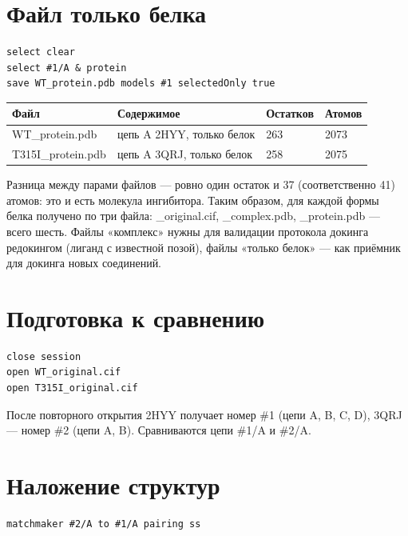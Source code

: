 \documentclass[12pt,a4paper]{article}
\newcommand{\code}[1]{{\ttfamily #1}}
\begin{document}
\section{Файл только белка}

\begin{verbatim}
select clear
select #1/A & protein
save WT_protein.pdb models #1 selectedOnly true
\end{verbatim}

\begin{center}
\begin{tabular}{L{4.6cm}L{4.1cm}L{2.3cm}L{2.3cm}}
\toprule
\textbf{Файл} & \textbf{Содержимое} & \textbf{Остатков} & \textbf{Атомов} \\
\midrule
\code{WT\_protein.pdb} & цепь A 2HYY, только белок & 263 & 2073 \\
\code{T315I\_protein.pdb} & цепь A 3QRJ, только белок & 258 & 2075 \\
\bottomrule
\end{tabular}
\end{center}

\noindent Разница между парами файлов --- ровно один остаток и 37 (соответственно 41)
атомов: это и есть молекула ингибитора. Таким образом, для каждой формы белка получено
по три файла: \code{*\_original.cif}, \code{*\_complex.pdb}, \code{*\_protein.pdb} ---
всего шесть. Файлы «комплекс» нужны для валидации протокола докинга редокингом
(лиганд с известной позой), файлы «только белок» --- как приёмник для докинга новых
соединений.

\section{Подготовка к сравнению}

\begin{verbatim}
close session
open WT_original.cif
open T315I_original.cif
\end{verbatim}

\noindent После повторного открытия 2HYY получает номер \code{\#1} (цепи A, B, C, D),
3QRJ --- номер \code{\#2} (цепи A, B). Сравниваются цепи \code{\#1/A} и \code{\#2/A}.

\section{Наложение структур}

\begin{verbatim}
matchmaker #2/A to #1/A pairing ss
\end{verbatim}
\end{document}
